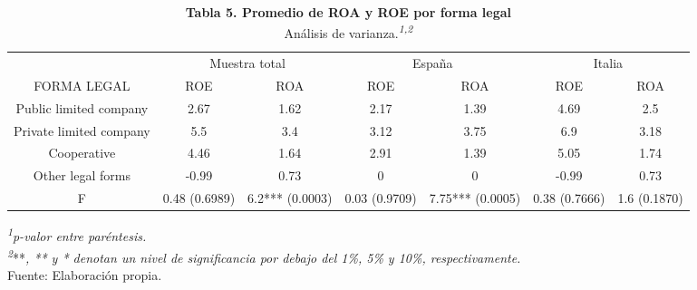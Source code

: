 \documentclass[
]{article}
\begin{document}
\begin{table}[!t]
\caption*{
{\large \textbf{Tabla 5. Promedio de ROA y ROE por forma legal}} \\ 
{\small Análisis de varianza.\textsuperscript{\textit{1,2}}}
} 
\fontsize{7.5pt}{9.0pt}\selectfont
\begin{tabular*}{\linewidth}{@{\extracolsep{\fill}}ccccccc}
\toprule
 & \multicolumn{2}{c}{Muestra total} & \multicolumn{2}{c}{España} & \multicolumn{2}{c}{Italia} \\ 
\cmidrule(lr){2-3} \cmidrule(lr){4-5} \cmidrule(lr){6-7}
FORMA LEGAL & ROE & ROA & ROE & ROA & ROE & ROA \\ 
\midrule\addlinespace[2.5pt]
Public limited company & 2.67 & 1.62 & 2.17 & 1.39 & 4.69 & 2.5 \\ 
Private limited company & 5.5 & 3.4 & 3.12 & 3.75 & 6.9 & 3.18 \\ 
Cooperative & 4.46 & 1.64 & 2.91 & 1.39 & 5.05 & 1.74 \\ 
Other legal forms & -0.99 & 0.73 & 0 & 0 & -0.99 & 0.73 \\ 
F & 0.48 (0.6989) & 6.2*** (0.0003) & 0.03 (0.9709) & 7.75*** (0.0005) & 0.38 (0.7666) & 1.6 (0.1870) \\ 
\bottomrule
\end{tabular*}
\begin{minipage}{\linewidth}
\textsuperscript{\textit{1}}\emph{p-valor entre paréntesis.}\\
\textsuperscript{\textit{2}}**\emph{, ** y * denotan un nivel de significancia
por debajo del 1\%, 5\% y 10\%, respectivamente.}\\
Fuente: Elaboración propia.\\
\end{minipage}
\end{table}
\end{document}
